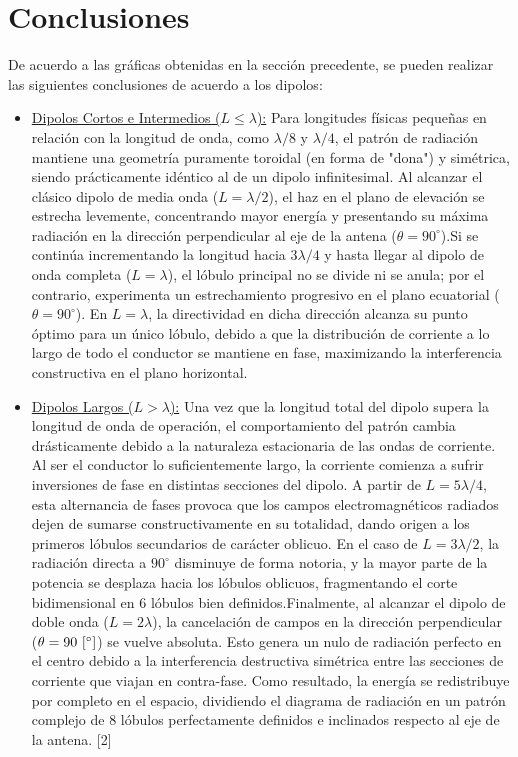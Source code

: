\documentclass[12pt,a4paper]{article}
\begin{document}
\section{Conclusiones}
De acuerdo a las gráficas obtenidas en la sección precedente, se pueden realizar las siguientes conclusiones de acuerdo a los dipolos:
\begin{itemize}
    \item \underline{Dipolos Cortos e Intermedios ($L \le \lambda$):} Para longitudes físicas pequeñas en relación con la longitud de onda, como $\lambda/8$ y $\lambda/4$, el patrón de radiación mantiene una geometría puramente toroidal (en forma de "dona") y simétrica, siendo prácticamente idéntico al de un dipolo infinitesimal. Al alcanzar el clásico dipolo de media onda ($L = \lambda/2$), el haz en el plano de elevación se estrecha levemente, concentrando mayor energía y presentando su máxima radiación en la dirección perpendicular al eje de la antena ($\theta = 90^\circ$).Si se continúa incrementando la longitud hacia $3\lambda/4$ y hasta llegar al dipolo de onda completa ($L = \lambda$), el lóbulo principal no se divide ni se anula; por el contrario, experimenta un estrechamiento progresivo en el plano ecuatorial ($\theta = 90^\circ$). En $L = \lambda$, la directividad en dicha dirección alcanza su punto óptimo para un único lóbulo, debido a que la distribución de corriente a lo largo de todo el conductor se mantiene en fase, maximizando la interferencia constructiva en el plano horizontal.

    \item \underline{Dipolos Largos ($L > \lambda$):} Una vez que la longitud total del dipolo supera la longitud de onda de operación, el comportamiento del patrón cambia drásticamente debido a la naturaleza estacionaria de las ondas de corriente. Al ser el conductor lo suficientemente largo, la corriente comienza a sufrir inversiones de fase en distintas secciones del dipolo. A partir de $L = 5\lambda/4$, esta alternancia de fases provoca que los campos electromagnéticos radiados dejen de sumarse constructivamente en su totalidad, dando origen a los primeros lóbulos secundarios de carácter oblicuo. En el caso de $L = 3\lambda/2$, la radiación directa a $90^\circ$ disminuye de forma notoria, y la mayor parte de la potencia se desplaza hacia los lóbulos oblicuos, fragmentando el corte bidimensional en 6 lóbulos bien definidos.Finalmente, al alcanzar el dipolo de doble onda ($L = 2\lambda$), la cancelación de campos en la dirección perpendicular ($\theta = 90 \ [\degree]$) se vuelve absoluta. Esto genera un nulo de radiación perfecto en el centro debido a la interferencia destructiva simétrica entre las secciones de corriente que viajan en contra-fase. Como resultado, la energía se redistribuye por completo en el espacio, dividiendo el diagrama de radiación en un patrón complejo de 8 lóbulos perfectamente definidos e inclinados respecto al eje de la antena. [2]
\end{itemize}
\end{document}
